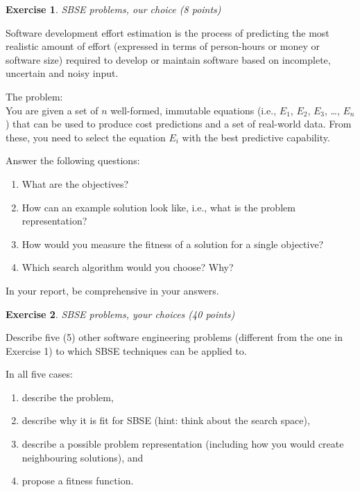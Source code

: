 \documentclass{pracs}
\newcommand{\ignore}[1]{}
\newtheorem{exercise}{Exercise}
\begin{document}
\ignore{\begin{exercise}
Team work: who has done what? (zero points)
\end{exercise}
We'd like each team member to write one paragraph about what he or she has contributed to this assignment. We will not mark this, and it will not have any effect on the marking of the other exercises. You might now ask "why do this then?" --- well, through this no-stakes approach, we'd like to encourage self-regulation within the group and cooperative learning. You can't lose, you can only win.
}


\begin{exercise}
SBSE problems, our choice (8 points)
\end{exercise}

Software development effort estimation is the process of predicting the most realistic amount of effort (expressed in terms of person-hours or money or software size) required to develop or maintain software based on incomplete, uncertain and noisy input. 

The problem:\\
You are given a set of $n$ well-formed, immutable equations (i.e., $E_1$, $E_2$, $E_3$, \ldots, $E_n$) that can be used to produce cost predictions and a set of real-world data. From these, you need to select the equation $E_i$ with the best predictive capability.

Answer the following questions:
\begin{enumerate}
\item What are the objectives?
\item How can an example solution look like, i.e., what is the problem representation?
\item How would you measure the fitness of a solution for a single objective?
\item Which search algorithm would you choose? Why?
\end{enumerate}

In your report, be comprehensive in your answers. 

\begin{exercise}
SBSE problems, your choices (40 points)
\end{exercise}

Describe five (5) other software engineering problems (different from the one in Exercise 1) to which SBSE techniques can be applied to. 

In all five cases:
\begin{enumerate}
\item describe the problem, 
\item describe why it is fit for SBSE (hint: think about the search space), 
\item describe a possible problem representation (including how you would create neighbouring solutions), and 
\item propose a fitness function.
\end{enumerate}
\end{document}
